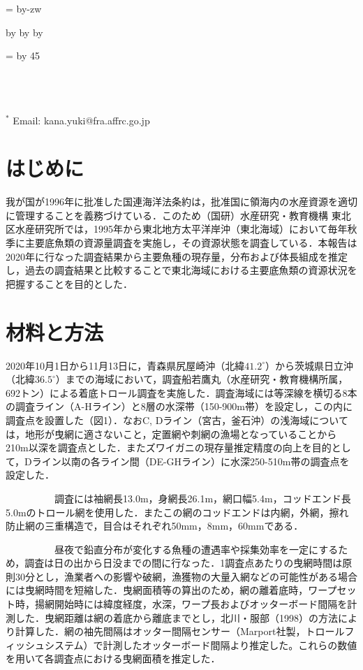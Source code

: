 \documentclass[11pt]{article} %
\makeatletter
\def\mojiparline#1{
\newcounter{mpl}
\setcounter{mpl}{#1}
\@tempdima=\linewidth
\advance\@tempdima by-\value{mpl}zw
\addtocounter{mpl}{-1}
\divide\@tempdima by \value{mpl}
\advance\kanjiskip by\@tempdima
\advance\parindent by\@tempdima
}
\def\linesparpage#1{
\baselineskip=\textheight
\divide\baselineskip by #1
}
\makeatother
\begin{document}

\mojiparline{40} %
\linesparpage{45} %


\\
\\
\ \\
$^{\ast}$ Email: kana.yuki@fra.affrc.go.jp\\

\begin{linenumbers}
\section{はじめに}
我が国が1996年に批准した国連海洋法条約は，批准国に領海内の水産資源を適切に管理することを義務づけている．このため（国研）水産研究・教育機構 東北区水産研究所では，1995年から東北地方太平洋岸沖（東北海域）において毎年秋季に主要底魚類の資源量調査を実施し，その資源状態を調査している．本報告は2020年に行なった調査結果から主要魚種の現存量，分布および体長組成を推定し，過去の調査結果と比較することで東北海域における主要底魚類の資源状況を把握することを目的とした．

\section{材料と方法}
2020年10月1日から11月13日に，青森県尻屋崎沖（北緯$\textrm{41.2}^\circ$）から茨城県日立沖（北緯$\textrm{36.5}^\circ$）までの海域において，調査船若鷹丸（水産研究・教育機構所属，692トン）による着底トロール調査を実施した．調査海域には等深線を横切る8本の調査ライン（A-Hライン）と8層の水深帯（150-900m帯）を設定し，この内に調査点を設置した（図1）．なおC, Dライン（宮古，釜石沖）の浅海域については，地形が曳網に適さないこと，定置網や刺網の漁場となっていることから210m以深を調査点とした．またズワイガニの現存量推定精度の向上を目的として，Dライン以南の各ライン間（DE-GHライン）に水深250-510m帯の調査点を設定した．

\ \ \ \ \ \ \ \ \ \ 
調査には袖網長13.0m，身網長26.1m，網口幅5.4m，コッドエンド長5.0mのトロール網を使用した．またこの網のコッドエンドは内網，外網，擦れ防止網の三重構造で，目合はそれぞれ50mm，8mm，60mmである．

\ \ \ \ \ \ \ \ \ \ 
昼夜で鉛直分布が変化する魚種の遭遇率や採集効率を一定にするため，調査は日の出から日没までの間に行なった．1調査点あたりの曳網時間は原則30分とし，漁業者への影響や破網，漁獲物の大量入網などの可能性がある場合には曳網時間を短縮した．曳網面積等の算出のため，網の離着底時，ワープセット時，揚網開始時には緯度経度，水深，ワープ長およびオッターボード間隔を計測した．曳網距離は網の着底から離底までとし，北川・服部（1998）の方法により計算した．網の袖先間隔はオッター間隔センサー（Marport社製，トロールフィッシュシステム）で計測したオッターボード間隔より推定した。これらの数値を用いて各調査点における曳網面積を推定した．


\end{linenumbers}
\end{document}
